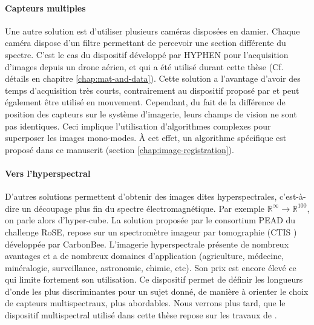 \documentclass[../thesis.tex]{subfiles}
\begin{document}
    \paragraph{Capteurs multiples}
    
    Une autre solution est d'utiliser plusieurs caméras disposées en damier. Chaque caméra dispose d'un filtre permettant de percevoir une section différente du spectre. C'est le cas du dispositif développé par HYPHEN pour l'acquisition d'images depuis un drone aérien, et qui a été utilisé durant cette thèse (Cf. détails en chapitre \ref{chap:mat-and-data}). Cette solution a l'avantage d'avoir des temps d'acquisition très courts, contrairement au dispositif proposé par \cite{vioix2004} et peut également être utilisé en mouvement. Cependant, du fait de la différence de position des capteurs sur le système d'imagerie, leurs champs de vision ne sont pas identiques. Ceci implique l'utilisation d'algorithmes complexes pour superposer les images mono-modes. À cet effet, un algorithme spécifique est proposé dans ce manuscrit (section \ref{chap:image-registration}).
    
    \paragraph{Vers l'hyperspectral}
    
    D'autres solutions permettent d'obtenir des images dites hyperspectrales, c'est-à-dire un découpage plus fin du spectre électromagnétique. Par exemple $\mathbb{R}^\infty \rightarrow \mathbb{R}^{100}$, on parle alors d'hyper-cube. La solution proposée par le consortium PEAD du challenge RoSE, repose sur un spectromètre imageur par tomographie (CTIS \cite{descour1995computed}) développée par CarbonBee. L'imagerie hyperspectrale présente de nombreux avantages et a de nombreux domaines d'application (agriculture, médecine, minéralogie, surveillance, astronomie, chimie, etc). Son prix est encore élevé ce qui limite fortement son utilisation. Ce dispositif permet de définir les longueurs d'onde les plus discriminantes pour un sujet donné, de manière à orienter le choix de capteurs multispectraux, plus abordables. Nous verrons plus tard, que le dispositif multispectral utilisé dans cette thèse repose sur les travaux de \cite{louar2016}.
    
\end{document}
